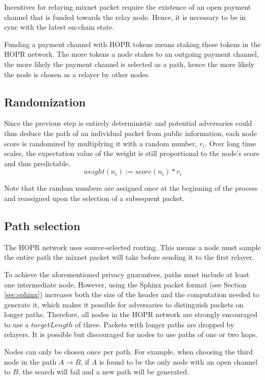 Incentives for relaying mixnet packet require the existence of an open payment channel that is funded towards the relay node. Hence, it is necessary to be in sync with the latest on-chain state.

Funding a payment channel with HOPR tokens means staking these tokens in the HOPR network. The more tokens a node stakes to an outgoing payment channel, the more likely the payment channel is selected as a path, hence the more likely the node is chosen as a relayer by other nodes.

\subsection{Randomization}
\label{sec:path-selection:randomization}

Since the previous step is entirely deterministic and potential adversaries could thus deduce the path of an individual packet from public information, each node score is randomized by multiplying it with a random number, $r_i$. Over long time scales, the expectation value of the weight is still proportional to the node's score and thus predictable.
$$weight(n_i) := score(n_i) * r_i$$

Note that the random numbers are assigned once at the beginning of the process and reassigned upon the selection of a subsequent packet.

\subsection{Path selection}
\label{sec:path-selection:graph-traversal}

The HOPR network uses source-selected routing. This means a node must sample the entire path the mixnet packet will take before sending it to the first relayer.

To achieve the aforementioned privacy guarantees, paths must include at least one intermediate node. However, using the Sphinx packet format (see Section \ref{sec:sphinx}) increases both the size of the header and the computation needed to generate it, which makes it possible for adversaries to distinguish packets on longer paths. Therefore, all nodes in the HOPR network are strongly encouraged to use a $targetLength$ of three. Packets with longer paths are dropped by relayers. It is possible but discouraged for nodes to use paths of one or two hops.

Nodes can only be chosen once per path. For example, when choosing the third node in the path $A\rightarrow B$, if $A$ is found to be the only node with an open channel to $B$, the search will fail and a new path will be generated.

